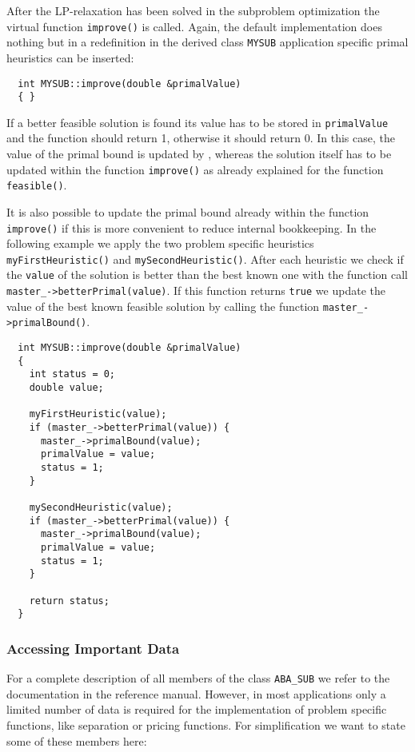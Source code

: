 \noindent
After the LP-relaxation has been solved in the subproblem optimization
the virtual function {\tt improve()} is called. Again, the default implementation
does nothing but in a redefinition in the derived class {\tt MYSUB} application
specific primal heuristics can be inserted:
\begin{verbatim}
  int MYSUB::improve(double &primalValue)
  { }
\end{verbatim}
If a better feasible solution is found its value has to be stored in {\tt primalValue}
and the function should return 1, otherwise it should return 0.
In this case, the value of the primal bound is updated by \ABACUS,
whereas the solution itself has to be updated within the function
{\tt improve()} as already explained for the function {\tt feasible()}.

It is also possible to update the primal bound already within the
function {\tt improve()} if this is more convenient to reduce internal
bookkeeping. In the following example we apply the two problem specific
heuristics {\tt myFirstHeuristic()} and {\tt mySecondHeuristic()}.
After each heuristic we check if the {\tt value} of the solution
is better than the best known one with the function call
{\tt master\_->betterPrimal(value)}. 
If this function
returns {\tt true} we update the value of the best known feasible solution by
calling the function 
{\tt master\_->primalBound()}.
\begin{verbatim}
  int MYSUB::improve(double &primalValue) 
  {
    int status = 0;
    double value;
  
    myFirstHeuristic(value);
    if (master_->betterPrimal(value)) {
      master_->primalBound(value);
      primalValue = value;
      status = 1;
    }
  
    mySecondHeuristic(value);
    if (master_->betterPrimal(value)) {
      master_->primalBound(value);
      primalValue = value;
      status = 1;
    }
  
    return status;
  }
\end{verbatim}

\subsubsection{Accessing Important Data}

\noindent
For a complete description of all members of the class {\tt ABA\_SUB} we refer
to the documentation in the reference manual.
However, in most applications only a limited number
of data is required for the implementation of problem specific functions,
like separation or pricing functions.
For simplification we want to state some of these members here:

